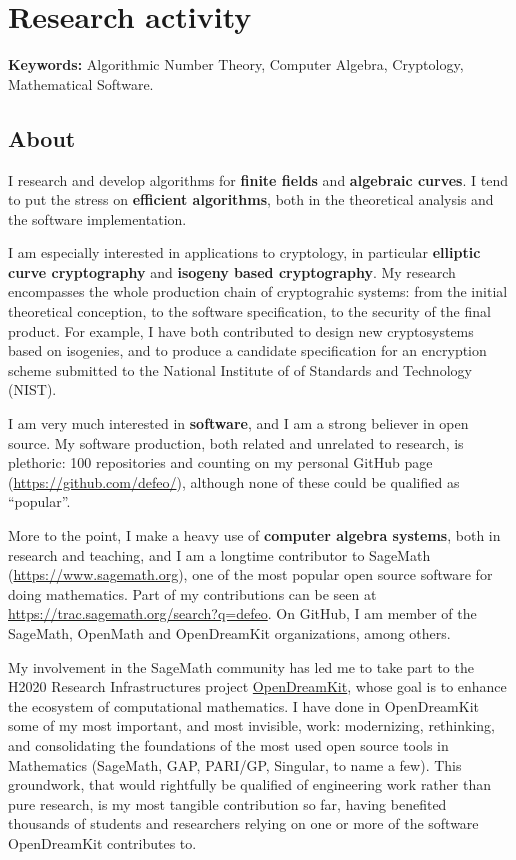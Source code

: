 \documentclass{book}
\begin{document}
\section*{Research activity}

\textbf{Keywords:} Algorithmic Number Theory, Computer Algebra,
Cryptology, Mathematical Software.

\subsection*{About}

I research and develop algorithms for \textbf{finite fields} and
\textbf{algebraic curves}. I tend to put the stress on
\textbf{efficient algorithms}, both in the theoretical analysis and
the software implementation.

I am especially interested in applications to cryptology, in
particular \textbf{elliptic curve cryptography} and \textbf{isogeny
  based cryptography}.  My research encompasses the whole production
chain of cryptograhic systems: from the initial theoretical
conception, to the software specification, to the security of the
final product.  For example, I have both contributed to design new
cryptosystems based on isogenies, and to produce a candidate
specification for an encryption scheme submitted to the National
Institute of of Standards and Technology (NIST).

I am very much interested in \textbf{software}, and I am a strong
believer in open source. My software production, both related and
unrelated to research, is plethoric: 100 repositories and counting on
my personal GitHub page (\url{https://github.com/defeo/}), although
none of these could be qualified as ``popular''.

More to the point, I make a heavy use of \textbf{computer algebra
  systems}, both in research and teaching, and I am a longtime
contributor to SageMath (\url{https://www.sagemath.org}), one of the
most popular open source software for doing mathematics. Part of my
contributions can be seen at
\url{https://trac.sagemath.org/search?q=defeo}. On GitHub, I am member
of the SageMath, OpenMath and OpenDreamKit organizations, among
others.

My involvement in the SageMath community has led me to take part to
the H2020 Research Infrastructures project
\href{https://opendreamkit.org/}{OpenDreamKit}, whose goal is to
enhance the ecosystem of computational mathematics.  I have done in
OpenDreamKit some of my most important, and most invisible, work:
modernizing, rethinking, and consolidating the foundations of the most
used open source tools in Mathematics (SageMath, GAP, PARI/GP,
Singular, to name a few). This groundwork, that would rightfully be
qualified of engineering work rather than pure research, is my most
tangible contribution so far, having benefited thousands of students
and researchers relying on one or more of the software OpenDreamKit
contributes to.
\end{document}
